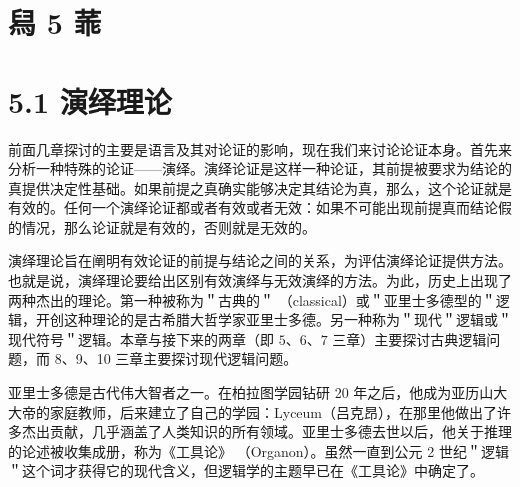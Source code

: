 \section*{舄 5 䓙}
\section*{5.1 演绎理论}
前面几章探讨的主要是语言及其对论证的影响，现在我们来讨论论证本身。首先来分析一种特殊的论证——演绎。演绎论证是这样一种论证，其前提被要求为结论的真提供决定性基础。如果前提之真确实能够决定其结论为真，那么，这个论证就是有效的。任何一个演绎论证都或者有效或者无效：如果不可能出现前提真而结论假的情况，那么论证就是有效的，否则就是无效的。

演绎理论旨在阐明有效论证的前提与结论之间的关系，为评估演绎论证提供方法。也就是说，演绎理论要给出区别有效演绎与无效演绎的方法。为此，历史上出现了两种杰出的理论。第一种被称为＂古典的＂ （classical）或＂亚里士多德型的＂逻辑，开创这种理论的是古希腊大哲学家亚里士多德。另一种称为＂现代＂逻辑或＂现代符号＂逻辑。本章与接下来的两章（即 $5 、 6 、 7$ 三章）主要探讨古典逻辑问题，而 8、9、10 三章主要探讨现代逻辑问题。

亚里士多德是古代伟大智者之一。在柏拉图学园钻研 20 年之后，他成为亚历山大大帝的家庭教师，后来建立了自己的学园：Lyceum（吕克昂），在那里他做出了许多杰出贡献，几乎涵盖了人类知识的所有领域。亚里士多德去世以后，他关于推理的论述被收集成册，称为《工具论》 （Organon）。虽然一直到公元 2 世纪＂逻辑＂这个词才获得它的现代含义，但逻辑学的主题早已在《工具论》中确定了。 